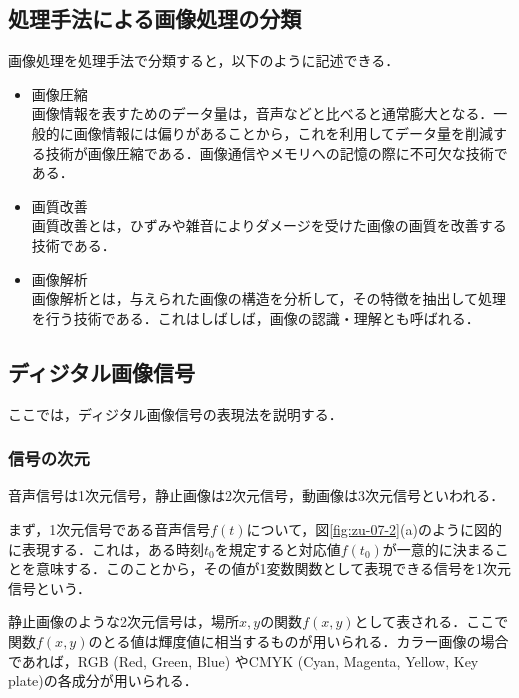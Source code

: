 \subsection{処理手法による画像処理の分類}

画像処理を処理手法で分類すると，以下のように記述できる．

\begin{itemize}
\item {}画像圧縮\\
画像情報を表すためのデータ量は，音声などと比べると通常膨大となる．一般的に画像情報には偏りがあることから，これを利用してデータ量を削減する技術が画像圧縮である．画像通信やメモリへの記憶の際に不可欠な技術である．
\item {}画質改善\\
画質改善とは，ひずみや雑音によりダメージを受けた画像の画質を改善する技術である．
\item {}画像解析\\
画像解析とは，与えられた画像の構造を分析して，その特徴を抽出して処理を行う技術である．これはしばしば，画像の認識・理解とも呼ばれる．
\end{itemize}

\subsection{ディジタル画像信号}

ここでは，ディジタル画像信号の表現法を説明する．

\subsubsection{信号の次元}

音声信号は1次元信号，静止画像は2次元信号，動画像は3次元信号といわれる．

まず，1次元信号である音声信号$f(t)$について，図\ref{fig:zu-07-2}(a)のように図的に表現する．これは，ある時刻$t_0$を規定すると対応値$f(t_0)$が一意的に決まることを意味する．このことから，その値が1変数関数として表現できる信号を1次元信号という．

静止画像のような2次元信号は，場所$x,y$の関数$f(x,y)$として表される．ここで関数$f(x,y)$のとる値は輝度値に相当するものが用いられる．カラー画像の場合であれば，RGB (Red, Green, Blue) やCMYK (Cyan, Magenta, Yellow, Key plate)の各成分が用いられる．


